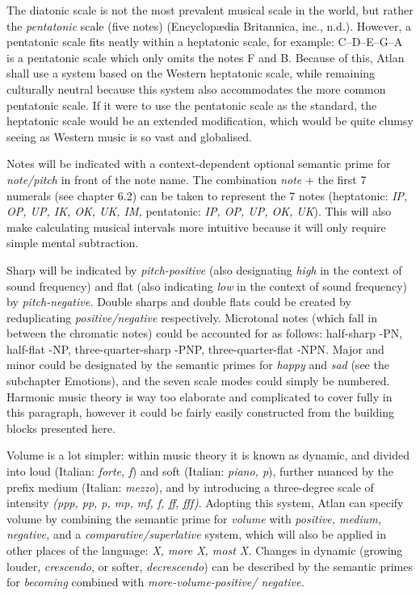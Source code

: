 The diatonic scale is not the most prevalent musical scale in the world,  but rather the \textit{pentatonic} scale (five notes) (Encyclop\ae dia Britannica, inc., n.d.). However, a pentatonic scale fits neatly within a heptatonic scale, for example: C–D–E–G–A is a pentatonic scale which only omits the notes F and B. Because of this, Atlan shall use a system based on the Western heptatonic scale, while remaining culturally neutral because this system also accommodates the more common pentatonic scale. If it were to use the pentatonic scale as the standard, the heptatonic scale would be an extended modification, which would be quite clumsy seeing as Western music is so vast and globalised. 

Notes will be indicated with a context-dependent optional semantic prime for \textit{note/pitch} in front of the note name. The combination {\it note} + the first 7 numerals (see chapter 6.2) can be taken to represent the 7 notes (heptatonic: \textit{IP, OP, UP, IK, OK, UK, IM,} pentatonic: \textit{IP, OP, UP, OK, UK}). This will also make calculating musical intervals more intuitive because it will only require simple mental subtraction. 

Sharp will be indicated by \textit{pitch-positive} (also designating \textit{high} in the context of sound frequency) and flat (also indicating \textit{low} in the context of sound frequency) by \textit{pitch-negative.} Double sharps and double flats could be created by reduplicating \textit{positive/negative} respectively. Microtonal notes (which fall in between the chromatic notes) could be accounted for as follows: half-sharp -PN, half-flat -NP, three-quarter-sharp  -PNP, three-quarter-flat -NPN. Major and minor could be designated by the semantic primes for \textit{happy} and \textit{sad} (see the subchapter Emotions), and the seven scale modes could simply be numbered. Harmonic music theory is way too elaborate and complicated to cover fully in this paragraph, however it could be fairly easily constructed from the building blocks presented here. 

Volume is a lot simpler: within music theory it is known as dynamic, and divided into loud (Italian: \textit{forte, f}) and soft (Italian: \textit{piano, p}), further nuanced by the prefix medium (Italian: \textit{mezzo}), and by introducing a three-degree scale of intensity \textit{(ppp, pp, p, mp, mf, f, ff, fff)}. Adopting this system, Atlan can specify volume by combining the semantic prime for \textit{volume} with \textit{positive, medium, negative,} and a \textit{comparative/superlative} system, which will also be applied in other places of the language: \textit{X, more X, most X.} Changes in dynamic (growing louder, \textit{crescendo}, or softer, \textit{decrescendo}) can be described by the semantic primes for \textit{becoming} combined with \textit{more-volume-positive/ negative.} 

